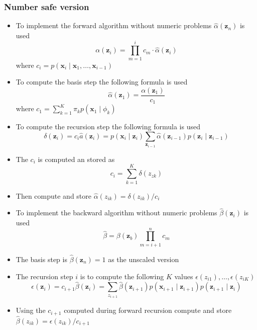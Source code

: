 \documentclass[a4, english]{article}
\begin{document}
\subsubsection{Number safe version}
\begin{itemize}
  \item To implement the forward algorithm without numeric problems $\hat \alpha (\pmb z_n)$ is used 
\begin{equation*}
	 \alpha (\pmb z_i) = \prod_{m=1}^i c_m \cdot \hat \alpha (\pmb z_i)
\end{equation*}
where $c_i = p (\pmb x_i \mid \pmb x_1, \dots, \pmb x_{i-1})$ 

  \item To compute the basis step the following formula is used
\begin{equation*}
  \hat \alpha (\pmb z_1) = \frac{\alpha(\pmb z_1)}{c_1}
\end{equation*}
where $c_1 = \sum_{k=1}^{K} \pi_k p(\pmb x_1 \mid \phi_k)$
  
 \item To compute the recursion step the following formula is used
\begin{equation*}
  \delta (\pmb z_{i}) = c_i \hat a (\pmb z_{i}) = p(\pmb x_i \mid \pmb z_i) \sum_{\pmb z_{i-1}} \hat \alpha (\pmb z_{i-1}) p(\pmb z_i \mid \pmb z_{i-1})
\end{equation*}
  \item The $c_i$ is computed an stored as
\begin{equation*}
	c_i = \sum_{k=1}^K \delta (z_{zk})
\end{equation*}
  \item Then compute and store $\hat \alpha(z_{ik}) = \delta(z_{ik})/c_i$ 

  \item To implement the backward algorithm without numeric problems $\hat \beta (\pmb z_i)$ is used 
\begin{equation*}
  \hat \beta = {\beta(\pmb z_b)}{\prod_{m=i+1}^n c_m}
\end{equation*}
  \item The basis step is $\hat \beta (\pmb z_n) = 1$ as the unscaled version
  \item The recursion step $i$ is to compute the following $K$ values $\epsilon(z_{i1}), \dots, \epsilon(z_{iK})$ 
\begin{equation*}
  \epsilon (\pmb z_i) = c_{i+1} \hat \beta(\pmb z_i) = \sum_{z_{i+1}} \hat \beta (\pmb z_{i+1}) p(\pmb x_{i+1} \mid \pmb z_{i+1}) p(\pmb z_{i+1} \mid \pmb z_i)
\end{equation*}
  \item Using the $c_{i+1}$ computed during forward recursion compute and store $\hat \beta (z_{ik}) = \epsilon (z_{ik}) / c_{i+1}$ 


\end{itemize}
\end{document}
